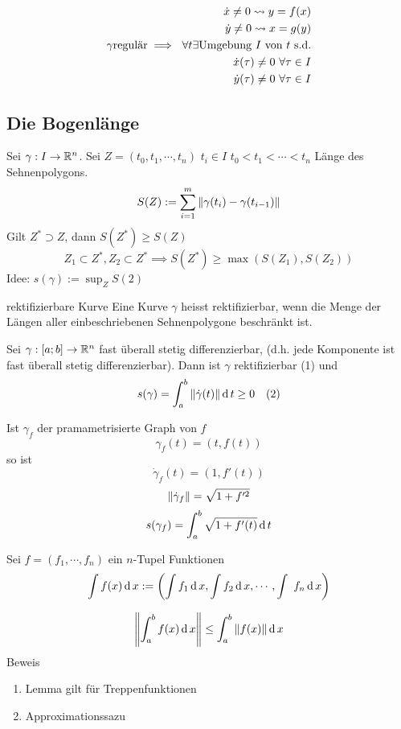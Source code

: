 \begin{Eig}
  \begin{align*}
    \dot{x}\neq 0 \rightsquigarrow y=f(x)\\
    \dot{y}\neq 0 \rightsquigarrow x=g(y)\\
    \gamma\text{regulär} \implies\ \forall t \exists \text{Umgebung $I$ von $t$ s.d.} \\
    \dot{x}(\tau)\neq 0\ \forall \tau\in I\\
    \dot{y}(\tau)\neq 0\ \forall \tau\in I
  \end{align*}
\end{Eig}
\subsection{Die Bogenlänge}
\begin{Def}
  Sei $\gamma:I\to\mathbb{R}^n$. Sei $Z=(t_0,t_1,\cdots,t_n)$ $t_i\in I$ $t_0<t_1<\cdots<t_n$ Länge des Sehnenpolygons.
  \[S(Z):=\sum^m_{i=1}\left\| \gamma(t_i)-\gamma(t_{i-1}) \right\|\]
  Gilt $Z^*\supset Z$, dann $S(Z^*)\geq S(Z)$
  \[Z_1\subset Z^*, Z_2\subset Z^* \implies S(Z^*)\geq \max\left( S(Z_1),S(Z_2) \right)\]
  Idee: $s(\gamma):=\sup_ZS(2)$
\end{Def}
\begin{Def}{rektifizierbare Kurve}
  Eine Kurve $\gamma$ heisst rektifizierbar, wenn die Menge der Längen aller einbeschriebenen Sehnenpolygone beschränkt ist.
\end{Def}
\begin{Sat}
  Sei $\gamma:[a;b]\to\mathbb{R}^n$ fast überall stetig differenzierbar, (d.h. jede Komponente ist fast überall stetig differenzierbar). Dann ist $\gamma$ rektifizierbar (1) und
  \begin{align*}
    s(\gamma)=\int^b_a\left\| \dot{\gamma}(t) \right\|\operatorname{d} t\geq 0& & (2)
  \end{align*}
\end{Sat}
\begin{Bem}
  Ist $\gamma_f$ der pramametrisierte Graph von $f$
  \[\gamma_f(t)=(t,f(t))\]
  so ist
  \[\dot{\gamma}_f(t)=(1,f'(t))\]
  \[\left\| \dot{\gamma}_f \right\|=\sqrt{1+f'^2}\]
  \[s(\gamma_f)=\int^b_a\sqrt{1+f'(t)}\operatorname{d} t\]
\end{Bem}
\begin{Not}
  Sei $f=(f_1,\cdots,f_n)$ ein $n$-Tupel Funktionen
  \[\int f(x)\operatorname{d} x:=\left( \int f_1\operatorname{d} x, \int f_2\operatorname{d} x,\cdots,\int\ f_n\operatorname{d} x \right)\]
\end{Not}
\begin{Lem}
  \[\left\| \int^b_af(x)\operatorname{d} x \right\|\leq \int^b_a\left\| f(x) \right\|\operatorname{d} x\]
  Beweis
  \begin{enumerate}
    \item Lemma gilt für Treppenfunktionen
    \item Approximationssazu
  \end{enumerate}
\end{Lem}
